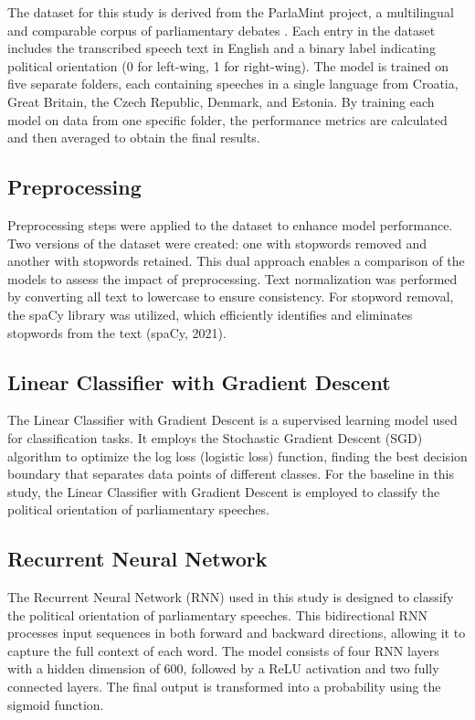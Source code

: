 \documentclass[10pt, a4paper]{article}
\begin{document}
The dataset for this study is derived from the ParlaMint project, a multilingual and comparable corpus of parliamentary debates \citep{parlamint-2021}. Each entry in the dataset includes the transcribed speech text in English and a binary label indicating political orientation (0 for left-wing, 1 for right-wing). The model is trained on five separate folders, each containing speeches in a single language from Croatia, Great Britain, the Czech Republic, Denmark, and Estonia. By training each model on data from one specific folder, the performance metrics are calculated and then averaged to obtain the final results.

\subsection{Preprocessing}
Preprocessing steps were applied to the dataset to enhance model performance. Two versions of the dataset were created: one with stopwords removed and another with stopwords retained. This dual approach enables a comparison of the models to assess the impact of preprocessing.
Text normalization was performed by converting all text to lowercase to ensure consistency. For stopword removal, the spaCy library was utilized, which efficiently identifies and eliminates stopwords from the text (spaCy, 2021).

\subsection{Linear Classifier with Gradient Descent} 

The Linear Classifier with Gradient Descent is a supervised learning model used for classification tasks. It employs the Stochastic Gradient Descent (SGD) algorithm to optimize the log loss (logistic loss) function, finding the best decision boundary that separates data points of different classes. For the baseline in this study, the Linear Classifier with Gradient Descent is employed to classify the political orientation of parliamentary speeches.

\subsection{Recurrent Neural Network} 

The Recurrent Neural Network (RNN) used in this study is designed to classify the political orientation of parliamentary speeches. This bidirectional RNN processes input sequences in both forward and backward directions, allowing it to capture the full context of each word. The model consists of four RNN layers with a hidden dimension of 600, followed by a ReLU activation and two fully connected layers. The final output is transformed into a probability using the sigmoid function.
\end{document}
